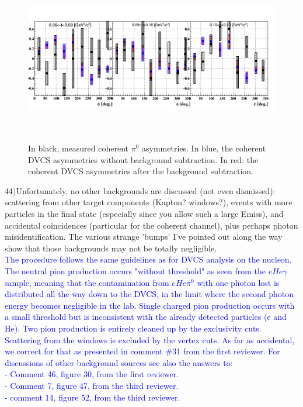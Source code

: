 \begin{figure}[tbp]
   \centering
   \includegraphics[height=7.5cm]{fig/coherent_AlU_pi0.png}
   \caption{In black, measured coherent $\pi^{0}$ asymmetries. In blue, the 
   coherent DVCS asymmetries without background subtraction. In red: the 
coherent DVCS asymmetries after the background subtraction.}
   \label{fig:coh_dvcs_pi0_Alu}
    \end{figure}


 
44)Unfortunately, no other backgrounds are discussed (not even dismissed): 
scattering from other target components (Kapton? windows?), events with more 
particles in the final state (especially since you allow such a large Emiss), 
and accidental coincidences (particular for the coherent channel), plus perhaps 
photon misidentification. The various strange 'bumps' I've pointed out along 
the way show that those backgrounds may not be totally negligible. \\
\textcolor{blue}{The procedure follows the same guidelines as for DVCS 
analysis on the nucleon. The neutral pion production occurs "without threshold" 
as seen from the $eHe\gamma$ sample, meaning that the contamination from 
$eHe\pi^0$ with one photon lost is distributed all the way down to the DVCS, 
in the limit where the second photon energy becomes negligible in 
the lab. Single charged pion production occurs with a small threshold but is 
inconsistent with the already detected particles (e and He). Two pion 
production is entirely cleaned up by the exclusivity cuts. Scattering from the 
windows is excluded by the vertex cuts. As far as accidental, we correct for 
that as presented in comment \#31 from the first reviewer. For discussions of 
other background sources see also the answers to:\\
- Comment 46, figure 30, from the first reviewer.\\
- Comment 7, figure 47, from the third reviewer.\\
- comment 14, figure 52, from the third reviewer.}\\


